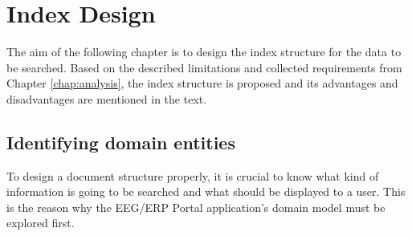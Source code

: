 \chapter{Index Design}
\label{chapter:indexDesign}

The aim of the following chapter is to design the index structure for the data to be searched. 
Based on the described limitations and collected requirements from Chapter \ref{chap:analysis}, the index structure is proposed and its advantages and disadvantages are mentioned in the text. 


%







\section{Identifying domain entities}

To design a document structure properly, it is crucial to know what kind of information is going to be searched and what should be displayed to a user.
This is the reason why the EEG/ERP Portal application's domain model must be explored first.

